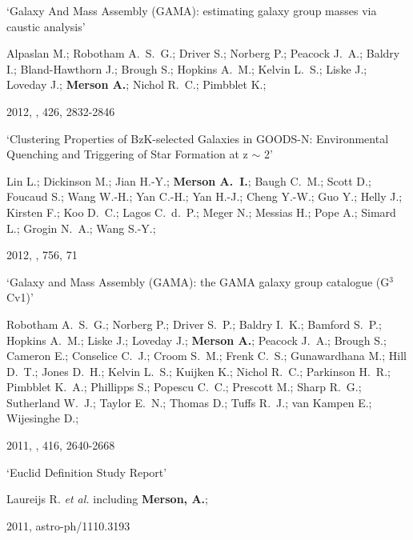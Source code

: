 \begin{etaremune}[leftmargin=15pt]
\item \label{itm:Alpaslan2012} `Galaxy And Mass Assembly (GAMA): estimating galaxy group masses via caustic analysis'\newline
  \begin{small}Alpaslan M.; Robotham A.~S.~G.; Driver S.; Norberg P.; Peacock J.~A.; Baldry I.; Bland-Hawthorn J.; Brough S.; Hopkins A.~M.; Kelvin L.~S.; Liske J.; Loveday J.; \textbf{Merson A.}; Nichol R.~C.; Pimbblet K.;\end{small} 2012, \mnras, 426, 2832-2846

\item \label{itm:Lin2012} `Clustering Properties of BzK-selected Galaxies in GOODS-N: Environmental Quenching and Triggering of Star Formation at z $\sim$ 2'\newline
  \begin{small}Lin L.; Dickinson M.; Jian H.-Y.; \textbf{Merson A.~I.}; Baugh C.~M.; Scott D.; Foucaud S.; Wang W.-H.; Yan C.-H.; Yan H.-J.; Cheng Y.-W.; Guo Y.; Helly J.; Kirsten F.; Koo D.~C.; Lagos C.~d.~P.; Meger N.; Messias H.; Pope A.; Simard L.; Grogin N.~A.; Wang S.-Y.;\end{small} 2012, \apj, 756, 71

\item \label{itm:Robotham2011} `Galaxy and Mass Assembly (GAMA): the GAMA galaxy group catalogue (G$^{3}$Cv1)'\newline
  \begin{small}Robotham A.~S.~G.; Norberg P.; Driver S.~P.; Baldry I.~K.; Bamford S.~P.; Hopkins A.~M.; Liske J.; Loveday J.; \textbf{Merson A.}; Peacock J.~A.; Brough S.; Cameron E.; Conselice C.~J.; Croom S.~M.; Frenk C.~S.; Gunawardhana M.; Hill D.~T.; Jones D.~H.; Kelvin L.~S.; Kuijken K.; Nichol R.~C.; Parkinson H.~R.; Pimbblet K.~A.; Phillipps S.; Popescu C.~C.; Prescott M.; Sharp R.~G.; Sutherland W.~J.; Taylor E.~N.; Thomas D.; Tuffs R.~J.; van Kampen E.; Wijesinghe D.;\end{small} 2011, \mnras, 416, 2640-2668

\item \label{itm:Laureijs2011} `Euclid Definition Study Report'\newline
  \begin{small}Laureijs R. \textit{et al.} including \textbf{Merson, A.};\end{small} 2011, astro-ph/1110.3193

\end{etaremune}

